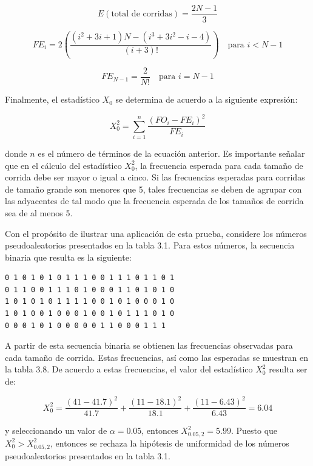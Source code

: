 \documentclass[11pt,letterpaper]{report}
\begin{document}
\begin{equation}
E(\text{total de corridas}) = \frac{2N-1}{3}
\end{equation}

\begin{equation}
FE_i = 2\left( \frac{(i^2+3i+1)N - (i^3+3i^2-i-4)}{(i+3)!} \right) \quad \text{para } i < N-1
\end{equation}

\begin{equation}
FE_{N-1} = \frac{2}{N!} \quad \text{para } i = N-1
\end{equation}

Finalmente, el estadístico $X_0$ se determina de acuerdo a la siguiente
expresión:

\begin{equation}
X_0^2 = \sum_{i=1}^{n} \frac{(FO_i - FE_i)^2}{FE_i}
\end{equation}

donde $n$ es el número de términos de la ecuación anterior. Es
importante señalar que en el cálculo del estadístico $X_0^2$, la
frecuencia esperada para cada tamaño de corrida debe ser mayor o igual a
cinco. Si las frecuencias esperadas para corridas de tamaño grande son
menores que 5, tales frecuencias se deben de agrupar con las adyacentes
de tal modo que la frecuencia esperada de los tamaños de corrida sea de
al menos 5.

Con el propósito de ilustrar una aplicación de esta prueba, considere
los números pseudoaleatorios presentados en la tabla 3.1. Para estos
números, la secuencia binaria que resulta es la siguiente:

\begin{verbatim}
0 1 0 1 0 1 0 1 1 1 0 0 1 1 1 0 1 1 0 1
0 1 1 0 0 1 1 1 0 1 0 0 0 1 1 0 1 0 1 0
1 0 1 0 1 0 1 1 1 1 0 0 1 0 1 0 0 0 1 0
1 0 1 0 0 1 0 0 0 1 0 0 1 0 1 1 1 0 1 0
0 0 0 1 0 1 0 0 0 0 0 1 1 0 0 0 1 1 1
\end{verbatim}

A partir de esta secuencia binaria se obtienen las frecuencias
observadas para cada tamaño de corrida. Estas frecuencias, así como las
esperadas se muestran en la tabla 3.8. De acuerdo a estas frecuencias,
el valor del estadístico $X_0^2$ resulta ser de:

\begin{equation}
X_0^2 = \frac{(41-41.7)^2}{41.7} + \frac{(11-18.1)^2}{18.1} +
\frac{(11-6.43)^2}{6.43} = 6.04
\end{equation}

y seleccionando un valor de $\alpha=0.05$, entonces $X^2_{0.05,2} =
5.99$. Puesto que $X_0^2 > X^2_{0.05,2}$, entonces se rechaza la
hipótesis de uniformidad de los números pseudoaleatorios presentados en
la tabla 3.1.
\end{document}
